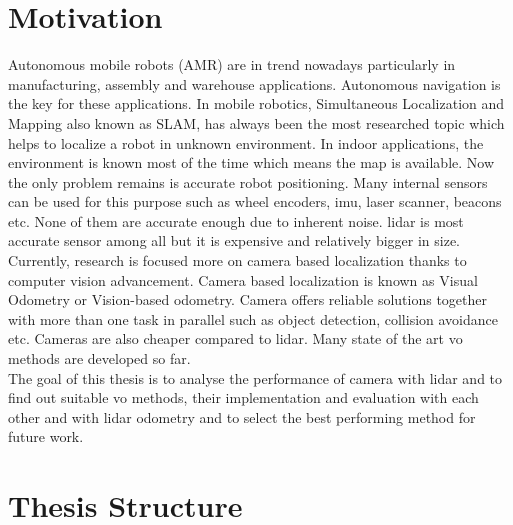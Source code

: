 \section{Motivation}
Autonomous mobile robots (AMR) are in trend nowadays particularly in manufacturing, assembly and warehouse applications. Autonomous navigation is the key for these applications. In mobile robotics, Simultaneous Localization and Mapping also known as SLAM, has always been the most researched topic which helps to localize a robot in unknown environment. In indoor applications, the environment is known most of the time which means the map is available. Now the only problem remains is accurate robot positioning. Many internal sensors can be used for this purpose such as wheel encoders, \acrshort{imu}, laser scanner, beacons etc. None of them are accurate enough due to inherent noise. \acrshort{lidar} is most accurate sensor among all but it is expensive and relatively bigger in size.\\
\newline
Currently, research is focused more on camera based localization thanks to computer vision advancement. Camera based localization is known as Visual Odometry or Vision-based odometry. Camera offers reliable solutions together with more than one task in parallel such as object detection, collision avoidance etc. Cameras are also cheaper compared to \acrshort{lidar}. Many state of the art \acrshort{vo} methods are developed so far.\\
\newline
The goal of this thesis is to analyse the performance of camera with \acrshort{lidar} and to find out suitable \acrshort{vo} methods, their implementation and evaluation with each other and with \acrshort{lidar} odometry and to select the best performing method for future work.

\section{Thesis Structure}

